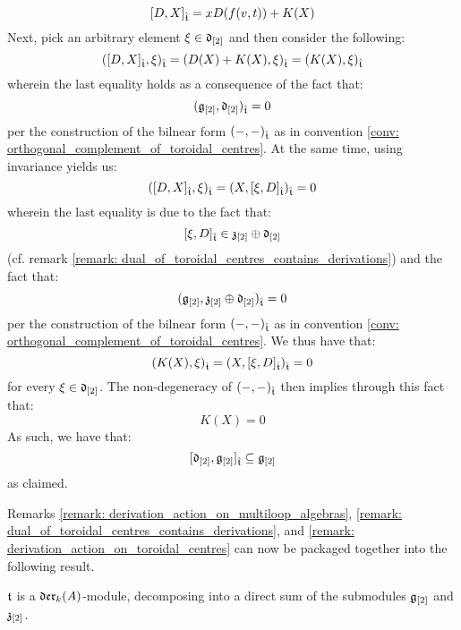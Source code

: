 \begin{remark}
\begin{enumerate}
                    $$[ D, X ]_{\hat{\mathfrak{t}}} = x D( f(v, t) ) + K(X)$$
                Next, pick an arbitrary element $\xi \in \mathfrak{d}_{[2]}$ and then consider the following:
                    $$( [ D, X ]_{\hat{\mathfrak{t}}}, \xi )_{\hat{\mathfrak{t}}} = (D(X) + K(X), \xi)_{\hat{\mathfrak{t}}} = (K(X), \xi)_{\hat{\mathfrak{t}}}$$
                wherein the last equality holds as a consequence of the fact that:
                    $$( \mathfrak{g}_{[2]}, \mathfrak{d}_{[2]} )_{\hat{\mathfrak{t}}} = 0$$
                per the construction of the bilnear form $(-, -)_{\hat{\mathfrak{t}}}$ as in convention \ref{conv: orthogonal_complement_of_toroidal_centres}. At the same time, using invariance yields us:
                    $$( [ D, X ]_{\hat{\mathfrak{t}}}, \xi )_{\hat{\mathfrak{t}}} = (X, [\xi, D]_{\hat{\mathfrak{t}}})_{\hat{\mathfrak{t}}} = 0$$
                wherein the last equality is due to the fact that:
                    $$[\xi, D]_{\hat{\mathfrak{t}}} \in \mathfrak{z}_{[2]} \oplus \mathfrak{d}_{[2]}$$
                (cf. remark \ref{remark: dual_of_toroidal_centres_contains_derivations}) and the fact that:
                    $$( \mathfrak{g}_{[2]}, \mathfrak{z}_{[2]} \oplus \mathfrak{d}_{[2]} )_{\hat{\mathfrak{t}}} = 0$$
                per the construction of the bilnear form $(-, -)_{\hat{\mathfrak{t}}}$ as in convention \ref{conv: orthogonal_complement_of_toroidal_centres}. We thus have that:
                    $$(K(X), \xi)_{\hat{\mathfrak{t}}} = (X, [\xi, D]_{\hat{\mathfrak{t}}})_{\hat{\mathfrak{t}}} = 0$$
                for every $\xi \in \mathfrak{d}_{[2]}$. The non-degeneracy of $(-, -)_{\hat{\mathfrak{t}}}$ then implies through this fact that:
                    $$K(X) = 0$$
                As such, we have that:
                    $$[ \mathfrak{d}_{[2]}, \mathfrak{g}_{[2]} ]_{\hat{\mathfrak{t}}} \subseteq \mathfrak{g}_{[2]}$$
                as claimed. 
            \end{enumerate}

        \end{remark}

        Remarks \ref{remark: derivation_action_on_multiloop_algebras}, \ref{remark: dual_of_toroidal_centres_contains_derivations}, and \ref{remark: derivation_action_on_toroidal_centres} can now be packaged together into the following result.
        \begin{proposition} \label{prop: toroidal_lie_algebras_as_modules_over_vector_field_lie_algebras}
            $\mathfrak{t}$ is a $\mathfrak{der}_{k}(A)$-module, decomposing into a direct sum of the submodules $\mathfrak{g}_{[2]}$ and $\mathfrak{z}_{[2]}$. 
        \end{proposition}

